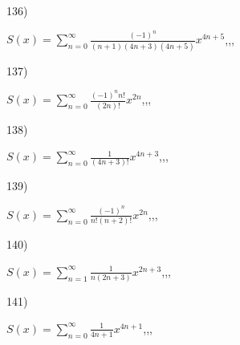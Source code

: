 \documentclass[11pt, ukrainian]{article}
\begin{document}
\par
\vspace{0.9cm}
136) \space 
{%
{$S(x)=\sum\limits_{n=0}^{\infty}{\frac{(-1)^n}{(n+1)(4n+3)(4n+5)}}{x^{{4n+5}}}$},,, \par \smallskip  
}
\par
\vspace{0.9cm}
137) \space 
{%
{$S(x)=\sum\limits_{n=0}^{\infty}{\frac{{(-1)^n}{n!}}{(2n)!}}{x^{{2n}}}$},,, \par \smallskip  
}
\par
\vspace{0.9cm}
138) \space 
{%
{$S(x)=\sum\limits_{n=0}^{\infty}{\frac{1}{(4n+3)!}}{x^{{4n+3}}}$},,, \par \smallskip  
}
\par
\vspace{0.9cm}
139) \space 
{%
{$S(x)=\sum\limits_{n=0}^{\infty}{\frac{(-1)^n}{n!(n+2)!}}{x^{{2n}}}$},,, \par \smallskip  
}
\par
\vspace{0.9cm}
140) \space 
{%
{$S(x)=\sum\limits_{n=1}^{\infty}{\frac{1}{n(2n+3)}}{x^{{2n+3}}}$},,, \par \smallskip  
}
\par
\vspace{0.9cm}
141) \space 
{%
{$S(x)=\sum\limits_{n=0}^{\infty}{\frac{1}{4n+1}}{x^{{4n+1}}}$},,, \par \smallskip  
}

\end{document}
